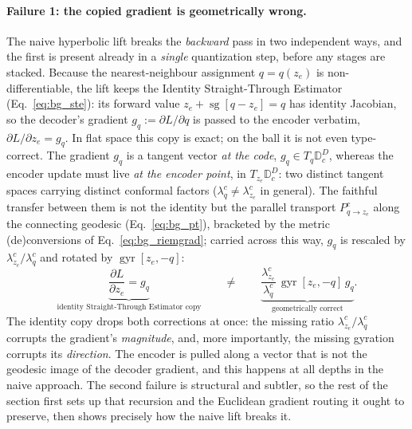 \documentclass[12pt]{report}
\begin{document}
\paragraph{Failure 1: the copied gradient is geometrically wrong.}
The naive hyperbolic lift breaks the \emph{backward} pass in two independent ways, and the first is present already in a \emph{single} quantization step, before any stages are stacked. Because the nearest-neighbour assignment $q=q(z_e)$ is non-differentiable, the lift keeps the Identity Straight-Through Estimator (Eq.~\ref{eq:bg_ste}): its forward value $z_e+\operatorname{sg}[q-z_e]=q$ has identity Jacobian, so the decoder's gradient $g_q:=\partial L/\partial q$ is passed to the encoder verbatim, $\partial L/\partial z_e=g_q$. In flat space this copy is exact; on the ball it is not even type-correct. The gradient $g_q$ is a tangent vector \emph{at the code}, $g_q\in T_q\mathbb{D}_c^D$, whereas the encoder update must live \emph{at the encoder point}, in $T_{z_e}\mathbb{D}_c^D$: two distinct tangent spaces carrying distinct conformal factors ($\lambda^c_q\neq\lambda^c_{z_e}$ in general). The faithful transfer between them is not the identity but the parallel transport $P^c_{q\to z_e}$ along the connecting geodesic (Eq.~\ref{eq:bg_pt}), bracketed by the metric (de)conversions of Eq.~\ref{eq:bg_riemgrad}; carried across this way, $g_q$ is rescaled by $\lambda^c_{z_e}/\lambda^c_q$ and rotated by $\operatorname{gyr}[z_e,-q]$:
\begin{equation}
    \label{eq:failure1}
    \underbrace{\frac{\partial L}{\partial z_e} = g_q}_{\text{identity Straight-Through Estimator copy}}
    \qquad\neq\qquad
    \underbrace{\frac{\lambda^c_{z_e}}{\lambda^c_q}\,\operatorname{gyr}[z_e,-q]\,g_q}_{\text{geometrically correct}} .
\end{equation}
The identity copy drops both corrections at once: the missing ratio $\lambda^c_{z_e}/\lambda^c_q$ corrupts the gradient's \emph{magnitude}, and, more importantly, the missing gyration corrupts its \emph{direction}. The encoder is pulled along a vector that is not the geodesic image of the decoder gradient, and this happens at all depths in the naive approach. The second failure is structural and subtler, so the rest of the section first sets up that recursion and the Euclidean gradient routing it ought to preserve, then shows precisely how the naive lift breaks it.
\end{document}
